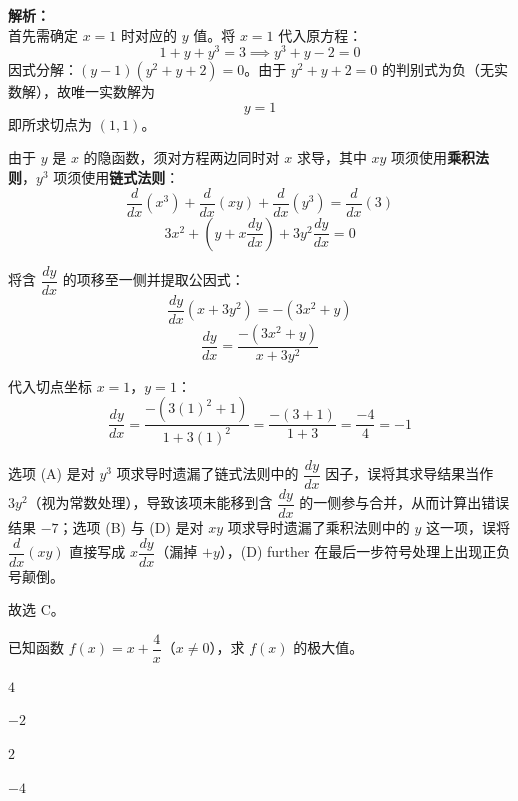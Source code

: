 \documentclass[12pt,a4paper]{exam-zh}
\begin{document}
\begin{solution}
    \textbf{解析：} \\
    首先需确定 $x=1$ 时对应的 $y$ 值。将 $x=1$ 代入原方程：
    \[ \displaystyle 1 + y + y^3 = 3 \implies y^3 + y - 2 = 0 \]
    因式分解：$(y-1)(y^2+y+2) = 0$。由于 $y^2+y+2=0$ 的判别式为负（无实数解），故唯一实数解为
    \[ \displaystyle y = 1 \]
    即所求切点为 $(1, 1)$。

    由于 $y$ 是 $x$ 的隐函数，须对方程两边同时对 $x$ 求导，其中 $xy$ 项须使用\textbf{乘积法则}，$y^3$ 项须使用\textbf{链式法则}：
    \[ \displaystyle \frac{d}{dx}(x^3) + \frac{d}{dx}(xy) + \frac{d}{dx}(y^3) = \frac{d}{dx}(3) \]
    \[ \displaystyle 3x^2 + \left(y + x\frac{dy}{dx}\right) + 3y^2\frac{dy}{dx} = 0 \]

    将含 $\dfrac{dy}{dx}$ 的项移至一侧并提取公因式：
    \[ \displaystyle \frac{dy}{dx}\left(x + 3y^2\right) = -\left(3x^2 + y\right) \]
    \[ \displaystyle \frac{dy}{dx} = \frac{-(3x^2+y)}{x+3y^2} \]

    代入切点坐标 $x=1$，$y=1$：
    \[ \displaystyle \frac{dy}{dx} = \frac{-(3(1)^2+1)}{1+3(1)^2} = \frac{-(3+1)}{1+3} = \frac{-4}{4} = -1 \]

    选项 (A) 是对 $y^3$ 项求导时遗漏了链式法则中的 $\dfrac{dy}{dx}$ 因子，误将其求导结果当作 $3y^2$（视为常数处理），导致该项未能移到含 $\dfrac{dy}{dx}$ 的一侧参与合并，从而计算出错误结果 $-7$；选项 (B) 与 (D) 是对 $xy$ 项求导时遗漏了乘积法则中的 $y$ 这一项，误将 $\dfrac{d}{dx}(xy)$ 直接写成 $x\dfrac{dy}{dx}$（漏掉 $+y$），(D) further 在最后一步符号处理上出现正负号颠倒。

    故选 C。
\end{solution}

\begin{question}
    已知函数 $f(x) = x + \dfrac{4}{x}$（$x \neq 0$），求 $f(x)$ 的极大值。\paren[D]
    \begin{choices}
        \item $4$
        \item $-2$
        \item $2$
        \item $-4$
    \end{choices}
\end{question}
\end{document}
